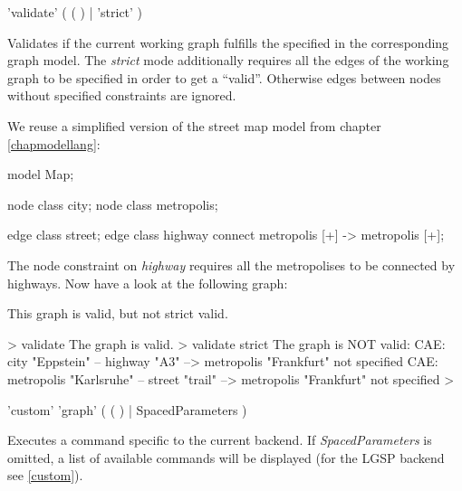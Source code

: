 \begin{rail}
  'validate' ( ( ) | 'strict' )
\end{rail}
Validates if the current working graph fulfills the  specified in the corresponding graph model. The \emph{strict} mode additionally requires all the edges of the working graph to be specified in order to get a ``valid''. Otherwise edges between nodes without specified constraints are ignored.\\
\begin{example}
We reuse a simplified version of the street map model from chapter \ref{chapmodellang}:
\begin{grgen} 
model Map;

node class city;
node class metropolis;

edge class street;
edge class highway
      connect metropolis [+] -> metropolis [+];
\end{grgen}
The node constraint on \emph{highway} requires all the metropolises to be connected by highways. Now have a look at the following graph:
\begin{center}
\end{center}

This graph is valid, but not strict valid.
\begin{grshell} 
> validate
The graph is valid.
> validate strict
The graph is NOT valid:
  CAE: city "Eppstein" -- highway "A3" --> metropolis "Frankfurt" not specified
  CAE: metropolis "Karlsruhe" -- street "trail" --> metropolis "Frankfurt" not specified
>
\end{grshell}
\end{example}

\begin{rail}
  'custom' 'graph' ( ( ) | SpacedParameters )
\end{rail}
Executes a command specific to the current backend. If \emph{SpacedParameters} is omitted, a list of available commands will be displayed (for the LGSP backend see \ref{custom}).

